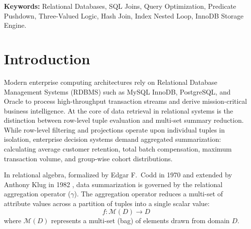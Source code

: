 \documentclass[10pt,twocolumn,letterpaper]{article}
\begin{document}
\vspace{1.0em}
\noindent\textbf{Keywords:} Relational Databases, SQL Joins, Query Optimization, Predicate Pushdown, Three-Valued Logic, Hash Join, Index Nested Loop, InnoDB Storage Engine.
\vspace{1.2em}

\section{Introduction}
\label{sec:intro}

Modern enterprise computing architectures rely on Relational Database Management Systems (RDBMS) such as MySQL InnoDB, PostgreSQL, and Oracle to process high-throughput transaction streams and derive mission-critical business intelligence. At the core of data retrieval in relational systems is the distinction between row-level tuple evaluation and multi-set summary reduction. While row-level filtering and projections operate upon individual tuples in isolation, enterprise decision systems demand aggregated summarization: calculating average customer retention, total batch compensation, maximum transaction volume, and group-wise cohort distributions.

In relational algebra, formalized by Edgar F.~Codd in 1970 \cite{codd1970} and extended by Anthony Klug in 1982 \cite{klug1982}, data summarization is governed by the relational aggregation operator ($\gamma$). The aggregation operator reduces a multi-set of attribute values across a partition of tuples into a single scalar value:
\begin{equation}
f: \mathcal{M}(D) \longrightarrow D
\end{equation}
where $\mathcal{M}(D)$ represents a multi-set (bag) of elements drawn from domain $D$.
\end{document}
